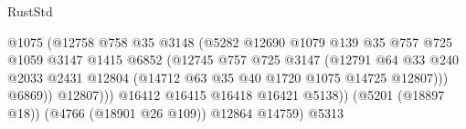 \begin{lexlean}{RustStd}
\begin{coremodule}
{\begin{coremodule}
{{{{{{{{{{{{{{{{{{{{{{{{{{{{{{{{{{{                                              @1075
                                              (@12758
                                                @758
                                                @35
                                                @3148
                                                (@5282
                                                  @12690
                                                  @1079
                                                  @139
                                                  @35
                                                  @757
                                                  @725
                                                  @1059
                                                  @3147
                                                  @1415
                                                  @6852
                                                  (@12745
                                                    @757
                                                    @725
                                                    @3147
                                                    (@12791
                                                      @64
                                                      @33
                                                      @240
                                                      @2033
                                                      @2431
                                                      @12804
                                                      (@14712
                                                        @63
                                                        @35
                                                        @40
                                                        @1720
                                                        @1075
                                                        @14725
                                                        @12807)))
                                                  @6869))
                                              @12807)))
                                        @16412
                                        @16415
                                        @16418
                                        @16421
                                        @5138))
                                    (@5201 (@18897 @18))
                                    (@4766 (@18901 @26 @109))
                                    @12864
                                    @14759)
                                  @5313
}}}}}}}}}}}}}}}}}}}}}}}}}}}}}}}}}}}
\end{coremodule}}
\end{coremodule}
\end{lexlean}
